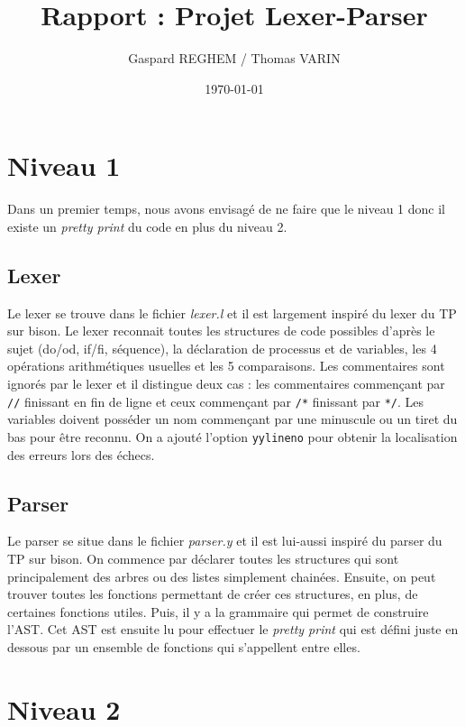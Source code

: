 \documentclass[10pt, a4paper]{article}
\title{Rapport : Projet Lexer-Parser}
\author{Gaspard REGHEM / Thomas VARIN}
\date{\today}
\begin{document}
\maketitle

\section{Niveau 1}

Dans un premier temps, nous avons envisagé de ne faire que le niveau 1 donc il existe un \textit{pretty print} du code en plus du niveau 2.

\subsection{Lexer}

Le lexer se trouve dans le fichier \textit{lexer.l} et il est largement inspiré du lexer du TP sur bison. Le lexer reconnait toutes les structures de code possibles d'après le sujet (do/od, if/fi, séquence), la déclaration de processus et de variables, les 4 opérations arithmétiques usuelles et les 5 comparaisons. Les commentaires sont ignorés par le lexer et il distingue deux cas : les commentaires commençant par \verb"//" finissant en fin de ligne et ceux commençant par \verb"/*" finissant par \verb"*/". Les variables doivent posséder un nom commençant par une minuscule ou un tiret du bas pour être reconnu. On a ajouté l'option \verb"yylineno" pour obtenir la localisation des erreurs lors des échecs.

\subsection{Parser}

Le parser se situe dans le fichier \textit{parser.y} et il est lui-aussi inspiré du parser du TP sur bison. On commence par déclarer toutes les structures qui sont principalement des arbres ou des listes simplement chainées. Ensuite, on peut trouver toutes les fonctions permettant de créer ces structures, en plus, de certaines fonctions utiles. Puis, il y a la grammaire qui permet de construire l'AST. Cet AST est ensuite lu pour effectuer le \textit{pretty print} qui est défini juste en dessous par un ensemble de fonctions qui s'appellent entre elles. 

\section{Niveau 2}
\end{document}
